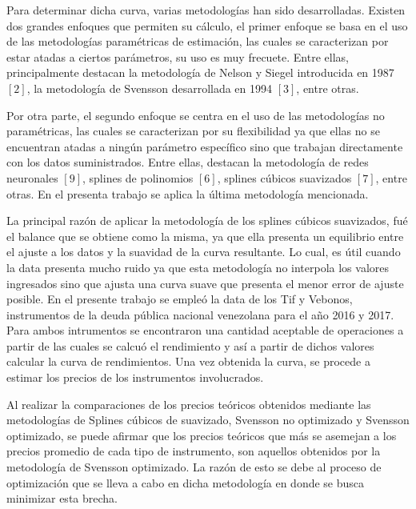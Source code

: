\hspace{0.4cm} Para determinar dicha curva, varias metodolog\'ias han sido desarrolladas. Existen dos grandes enfoques que permiten su c\'alculo, el primer enfoque se basa en el uso de las metodolog\'ias param\'etricas de estimaci\'on, las cuales se caracterizan por estar atadas a ciertos par\'ametros, su uso es muy frecuete. Entre ellas, principalmente destacan la metodolog\'ia de Nelson y Siegel introducida en 1987 $[2]$, la metodolog\'ia de Svensson desarrollada en 1994 $[3]$, entre otras.


\hspace{0.4cm}Por otra parte, el segundo enfoque se centra en el uso de las metodolog\'ias no param\'etricas, las cuales se caracterizan por su flexibilidad ya que ellas no se encuentran atadas a ning\'un par\'ametro espec\'ifico sino que trabajan directamente con los datos suministrados. Entre ellas, destacan la metodolog\'ia de redes neuronales $[9]$, splines de polinomios $[6]$, splines c\'ubicos suavizados $[7]$, entre otras. En el presenta trabajo se aplica la \'ultima metodolog\'ia mencionada.


\hspace{0.4cm} La principal raz\'on de aplicar la metodolog\'ia de los splines c\'ubicos suavizados, fu\'e el balance que se obtiene como la misma, ya que ella presenta un equilibrio entre el ajuste a los datos y la suavidad de la curva resultante. Lo cual, es \'util cuando la data presenta mucho ruido ya que esta metodolog\'ia no interpola los valores ingresados sino que ajusta una curva suave que presenta el menor error de ajuste posible. En el presente trabajo se emple\'o la data de los Tif y Vebonos, instrumentos de la deuda p\'ublica nacional venezolana para el a\~no 2016 y 2017. Para ambos intrumentos se encontraron una cantidad aceptable de operaciones a partir de las cuales se calcu\'o el rendimiento y as\'i a partir de dichos valores calcular la curva de rendimientos. Una vez obtenida la curva, se procede a estimar los precios de los instrumentos involucrados.

\hspace{0.4cm} Al realizar la comparaciones de los precios te\'oricos obtenidos mediante las metodolog\'ias de Splines c\'ubicos de suavizado, Svensson no optimizado y Svensson optimizado, se puede afirmar que los precios te\'oricos que m\'as se asemejan a los precios promedio de cada tipo de instrumento, son aquellos obtenidos por la metodolog\'ia de Svensson optimizado. La raz\'on de esto se debe al proceso de optimizaci\'on que se lleva a cabo en dicha metodolog\'ia en donde se busca minimizar esta brecha. 


